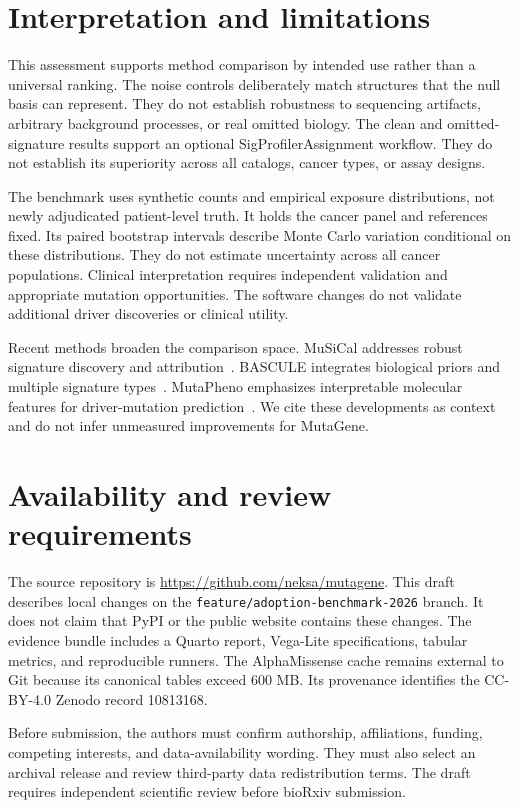 \documentclass[11pt]{article}
\begin{document}
\section{Interpretation and limitations}
This assessment supports method comparison by intended use rather than a universal ranking.
The noise controls deliberately match structures that the null basis can represent.
They do not establish robustness to sequencing artifacts, arbitrary background processes, or real omitted biology.
The clean and omitted-signature results support an optional SigProfilerAssignment workflow.
They do not establish its superiority across all catalogs, cancer types, or assay designs.

The benchmark uses synthetic counts and empirical exposure distributions, not newly adjudicated patient-level truth.
It holds the cancer panel and references fixed.
Its paired bootstrap intervals describe Monte Carlo variation conditional on these distributions.
They do not estimate uncertainty across all cancer populations.
Clinical interpretation requires independent validation and appropriate mutation opportunities.
The software changes do not validate additional driver discoveries or clinical utility.

Recent methods broaden the comparison space.
MuSiCal addresses robust signature discovery and attribution~\cite{musical}.
BASCULE integrates biological priors and multiple signature types~\cite{bascule}.
MutaPheno emphasizes interpretable molecular features for driver-mutation prediction~\cite{mutapheno}.
We cite these developments as context and do not infer unmeasured improvements for MutaGene.

\section{Availability and review requirements}
The source repository is \url{https://github.com/neksa/mutagene}.
This draft describes local changes on the \texttt{feature/adoption-benchmark-2026} branch.
It does not claim that PyPI or the public website contains these changes.
The evidence bundle includes a Quarto report, Vega-Lite specifications, tabular metrics, and reproducible runners.
The AlphaMissense cache remains external to Git because its canonical tables exceed 600 MB.
Its provenance identifies the CC-BY-4.0 Zenodo record 10813168.

Before submission, the authors must confirm authorship, affiliations, funding, competing interests, and data-availability wording.
They must also select an archival release and review third-party data redistribution terms.
The draft requires independent scientific review before bioRxiv submission.
\end{document}
